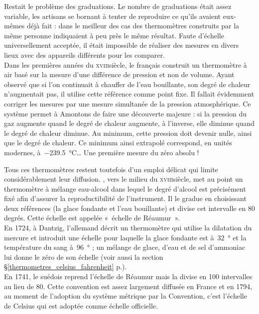 	Restait le problème des graduations. Le nombre de graduations était assez variable, les artisans se bornant à tenter de reproduire ce qu'ils avaient eux-mêmes déjà fait : dans le meilleur des cas des thermomètres construits par la même personne indiquaient à peu près le même résultat. Faute d'échelle universellement acceptée, il était impossible de réaliser des mesures en divers lieux avec des appareils différents pour les comparer.\\
	Dans les premières années du \textsc{xviii}\ieme siècle, le français  construit un thermomètre à air basé sur la mesure d'une différence de pression et non de volume. Ayant observé que si l'on continuait à chauffer de l'eau bouillante, son degré de chaleur n'augmentait pas, il utilise cette référence comme point fixe. Il fallait évidemment corriger les mesures par une mesure simultanée de la pression atmosphérique. Ce système permet à Amontons de faire une découverte majeure : si la pression du gaz augmente quand le degré de chaleur augmente, à l'inverse, elle diminue quand le degré de chaleur diminue. Au minimum, cette pression doit devenir nulle, ainsi que le degré de chaleur. Ce minimum ainsi extrapolé correspond, en unités modernes, à~\SI{-239,5}{\degreeCelsius}… Une première mesure du zéro absolu !

	Tous ces thermomètres restent toutefois d'un emploi délicat qui limite considérablement leur diffusion. , vers le milieu du \textsc{xviii}\ieme siècle, met au point un thermomètre à mélange eau-alcool dans lequel le degré d'alcool est précisément fixé afin d'assurer la reproductibilité de l'instrument. Il le gradue en choisissant deux références (la glace fondante et l'eau bouillante) et divise cet intervalle en 80 degrés. Cette échelle est appelée «~échelle de Réaumur~».\\	
	En 1724, à Dantzig, l’allemand  décrit un thermomètre qui utilise la dilatation du mercure et introduit une échelle pour laquelle la glace fondante est à~\SI{32}{\degree} et la température du sang à~\SI{96}{\degree} ; un mélange de glace, d'eau et de sel d'ammoniac lui donne le zéro de son échelle (voir aussi la section \S\ref{thermometres_celsius_fahrenheit} p.\pageref{thermometres_celsius_fahrenheit}).\\	
	En 1741, le suédois  reprend l'échelle de Réaumur mais la divise en 100 intervalles au lieu de 80. Cette convention est assez largement diffusée en France et en 1794, au moment de l'adoption du système métrique par la Convention, c'est l'échelle de Celsius qui est adoptée comme échelle officielle.

